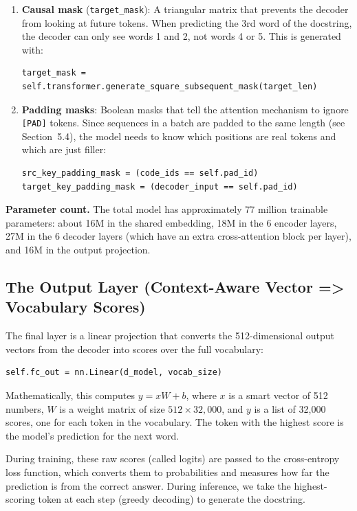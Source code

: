 \documentclass[11pt]{article}
\begin{document}
\begin{enumerate}
\item \textbf{Causal mask} (\texttt{target\_mask}): A triangular matrix that prevents the decoder from looking at future tokens. When predicting the 3rd word of the docstring, the decoder can only see words 1 and 2, not words 4 or 5. This is generated with:
\begin{lstlisting}[style=python]
target_mask = self.transformer.generate_square_subsequent_mask(target_len)
\end{lstlisting}

\item \textbf{Padding masks}: Boolean masks that tell the attention mechanism to ignore \texttt{[PAD]} tokens. Since sequences in a batch are padded to the same length (see Section~5.4), the model needs to know which positions are real tokens and which are just filler:
\begin{lstlisting}[style=python]
src_key_padding_mask = (code_ids == self.pad_id)
target_key_padding_mask = (decoder_input == self.pad_id)
\end{lstlisting}
\end{enumerate}

\textbf{Parameter count.} The total model has approximately 77 million trainable parameters: about 16M in the shared embedding, 18M in the 6 encoder layers, 27M in the 6 decoder layers (which have an extra cross-attention block per layer), and 16M in the output projection.

\subsection{The Output Layer (Context-Aware Vector => Vocabulary Scores)}

The final layer is a linear projection that converts the 512-dimensional output vectors from the decoder into scores over the full vocabulary:

\begin{lstlisting}[style=python]
self.fc_out = nn.Linear(d_model, vocab_size)
\end{lstlisting}

Mathematically, this computes $y = xW + b$, where $x$ is a smart vector of 512 numbers, $W$ is a weight matrix of size $512 \times 32{,}000$, and $y$ is a list of 32,000 scores, one for each token in the vocabulary. The token with the highest score is the model's prediction for the next word.

During training, these raw scores (called logits) are passed to the cross-entropy loss function, which converts them to probabilities and measures how far the prediction is from the correct answer. During inference, we take the highest-scoring token at each step (greedy decoding) to generate the docstring.
\end{document}
